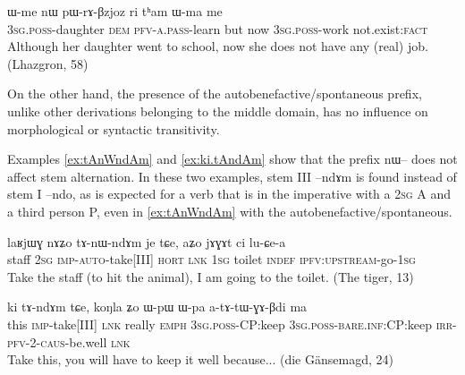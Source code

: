 \documentclass[oldfontcommands,oneside,a4paper,11pt]{article}
\newcommand{\ipa}[1]{{\phon \mbox{#1}}} %
\begin{document}
 \begin{exe}
\ex \label{ex:pWrABzjoz}
\gll 
\ipa{ɯ-me} 	\ipa{nɯ} 	\ipa{pɯ-rɤ-βzjoz} 	\ipa{ri} 	\ipa{tʰam} 	\ipa{ɯ-ma} 	\ipa{me} \\
\textsc{3sg.poss}-daughter \textsc{dem} \textsc{pfv-a.pass}-learn but now \textsc{3sg.poss}-work not.exist:\textsc{fact} \\
\glt Although her daughter went to school, now she does not have any (real) job. (Lhazgron, 58)
\end{exe}

On the other hand, the presence of the autobenefactive/spontaneous prefix, unlike other derivations belonging to the middle domain, has no influence on  morphological or syntactic transitivity. 
 
 Examples \ref{ex:tAnWndAm} and \ref{ex:ki.tAndAm} show that the prefix \ipa{nɯ--} does not affect stem alternation. In these two examples, stem III   \ipa{--ndɤm} is found instead of stem I \ipa{--ndo}, as is expected for a verb that is in the imperative with a \textsc{2sg} A and a third person P, even in \ref{ex:tAnWndAm} with the autobenefactive/spontaneous.
 

 \begin{exe}
\ex \label{ex:tAnWndAm}
\gll
\ipa{laʁjɯɣ} 	\ipa{nɤʑo} 	\ipa{tɤ-nɯ-ndɤm} 	\ipa{je} 	\ipa{tɕe,} 	\ipa{aʑo} 	\ipa{jɤɣɤt} 	\ipa{ci} 	\ipa{lu-ɕe-a} 	\\
staff \textsc{2sg} \textsc{imp-auto}-take[III] \textsc{hort} \textsc{lnk} \textsc{1sg} toilet \textsc{indef} \textsc{ipfv:upstream}-go-\textsc{1sg} \\
\glt Take the staff (to hit the animal), I am going to the toilet. (The tiger, 13) 
\end{exe}

 \begin{exe}
\ex \label{ex:ki.tAndAm}
\gll
\ipa{ki}  	\ipa{tɤ-ndɤm}  	\ipa{tɕe,}  	\ipa{koŋla}  	\ipa{ʑo}   \ipa{ɯ-pɯ}  	\ipa{ɯ-pa}  	\ipa{a-tɤ-tɯ-ɣɤ-βdi}  	\ipa{ma}  \\
this \textsc{imp}-take[III] \textsc{lnk} really \textsc{emph} \textsc{3sg.poss}-CP:keep \textsc{3sg.poss}-\textsc{bare.inf}:CP:keep \textsc{irr-pfv-2-caus}-be.well \textsc{lnk} \\
\glt Take this, you will have to keep it well because... (die Gänsemagd, 24)
\end{exe}
\end{document}
